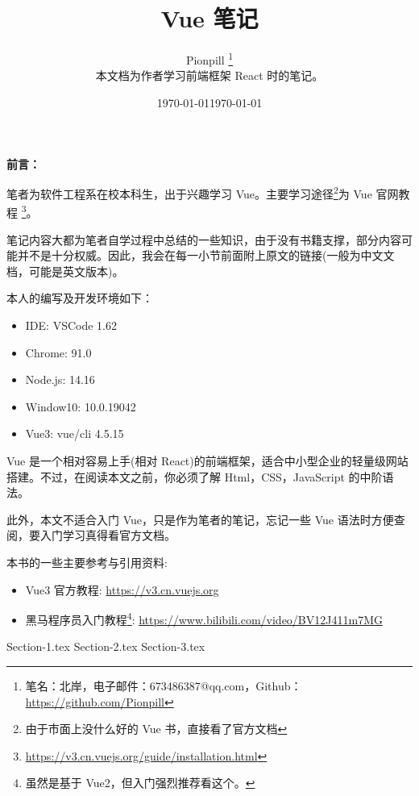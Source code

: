 \documentclass{PionpillNote-book}
\title{Vue 笔记}
\author{
    Pionpill \footnote{笔名：北岸，电子邮件：673486387@qq.com，Github：\url{https://github.com/Pionpill}} \\
    本文档为作者学习前端框架 React 时的笔记。\\
}
\date{\today}
\begin{document}
\pagestyle{plain}
\maketitle

\noindent\textbf{前言：}

笔者为软件工程系在校本科生，出于兴趣学习 Vue。主要学习途径\footnote{由于市面上没什么好的 Vue 书，直接看了官方文档}为 Vue 官网教程 \footnote{\url{https://v3.cn.vuejs.org/guide/installation.html}}。

笔记内容大都为笔者自学过程中总结的一些知识，由于没有书籍支撑，部分内容可能并不是十分权威。因此，我会在每一小节前面附上原文的链接(一般为中文文档，可能是英文版本)。

本人的编写及开发环境如下：
\begin{itemize}
    \item IDE: VSCode 1.62
    \item Chrome: 91.0
    \item Node.js: 14.16
    \item Window10: 10.0.19042
    \item Vue3: vue/cli 4.5.15
\end{itemize}

Vue 是一个相对容易上手(相对 React)的前端框架，适合中小型企业的轻量级网站搭建。不过，在阅读本文之前，你必须了解 Html，CSS，JavaScript 的中阶语法。

此外，本文不适合入门 Vue，只是作为笔者的笔记，忘记一些 Vue 语法时方便查阅，要入门学习真得看官方文档。

本书的一些主要参考与引用资料:
\begin{itemize}
    \item Vue3 官方教程: \url{https://v3.cn.vuejs.org}
    \item 黑马程序员入门教程\footnote{虽然是基于 Vue2，但入门强烈推荐看这个。}: \url{https://www.bilibili.com/video/BV12J411m7MG}
\end{itemize}

\date{\today}
\newpage

\tableofcontents

\newpage

\setcounter{page}{1} 
\pagestyle{fancy}


{Section-1.tex}
{Section-2.tex}
{Section-3.tex}
\end{document}
